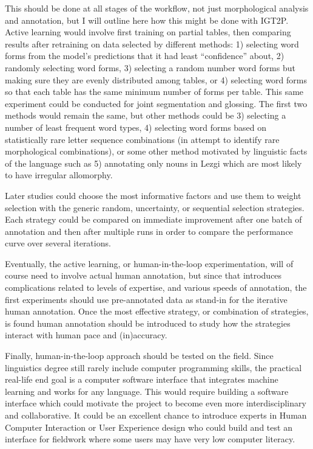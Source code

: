 This should be done at all stages of the workflow, not just morphological analysis and annotation, but I will outline here how this might be done with IGT2P.
Active learning would involve first training on partial tables, then comparing results after retraining on data selected by different methods: 1) selecting word forms from the model’s predictions that it had least ``confidence'' about, 2) randomly selecting word forms, 3) selecting a random number word forms but making sure they are evenly distributed among tables, or 4) selecting word forms so that each table has the same minimum number of forms per table. This same experiment could be conducted for joint segmentation and glossing. The first two methods would remain the same, but other methods could be 3) selecting a number of least frequent word types, 4) selecting word forms based on statistically rare letter sequence combinations (in attempt to identify rare morphological combinations), or some other method motivated by linguistic facts of the language such as 5) annotating only nouns in Lezgi which are most likely to have irregular allomorphy. 

Later studies could choose the most informative factors and use them to weight selection with the generic random, uncertainty, or sequential selection strategies.
Each strategy could be compared on immediate improvement after one batch of annotation and then after multiple runs in order to compare the performance curve over several iterations. 


Eventually, the active learning, or human-in-the-loop experimentation, will of course need to involve actual human annotation, but since that introduces complications related to levels of expertise, and various speeds of annotation, the first experiments should use pre-annotated data as stand-in for the iterative human annotation. Once the most effective strategy, or combination of strategies, is found human annotation should be introduced to study how the strategies interact with human pace and (in)accuracy. 

Finally, human-in-the-loop approach should be tested on the field. 
Since linguistics degree still rarely include computer programming skills, the practical real-life end goal is a computer software interface that integrates machine learning and works for any language. This would require building a software interface which could motivate the project to become even more interdisciplinary and collaborative. It could be an excellent chance to introduce experts in Human Computer Interaction or User Experience design who could build and test an interface for fieldwork where some users may have very low computer literacy.

